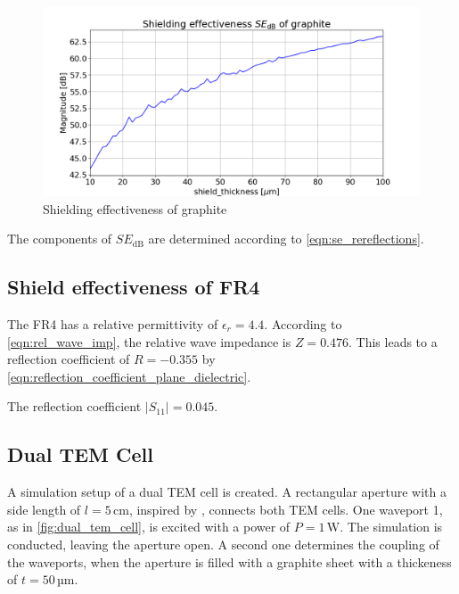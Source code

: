 \begin{figure}[h]
    \centering
    \includegraphics[width=1\linewidth]{Documentation//content//30_simulations//img/se_graphite.png}
    \caption{Shielding effectiveness of graphite}
    \label{fig:se_graphite}
\end{figure}


The components of $SE_\mathrm{dB}$ are determined according to \autoref{eqn:se_rereflections}. 

\subsection{Shield effectiveness of FR4}

The FR4 has a relative permittivity of $\epsilon_r=4.4$. According to \autoref{eqn:rel_wave_imp}, the relative wave impedance is $Z=0.476$. This leads to a reflection coefficient of $R=-0.355$ by \autoref{eqn:reflection_coefficient_plane_dielectric}.


The reflection coefficient $|S_{11}|=0.045$.

\subsection{Dual TEM Cell}

A simulation setup of a dual TEM cell is created. A rectangular aperture with a side length of $l=5\,\mathrm{cm}$, inspired by \cite{Wilson_1981}, connects both TEM cells. One waveport 1, as in \autoref{fig:dual_tem_cell}, is excited with a power of $P=1\,\mathrm{W}$. The simulation is conducted, leaving the aperture open. A second one determines the coupling of the waveports, when the aperture is filled with a graphite sheet with a thickeness of $t=50$\,µm.

